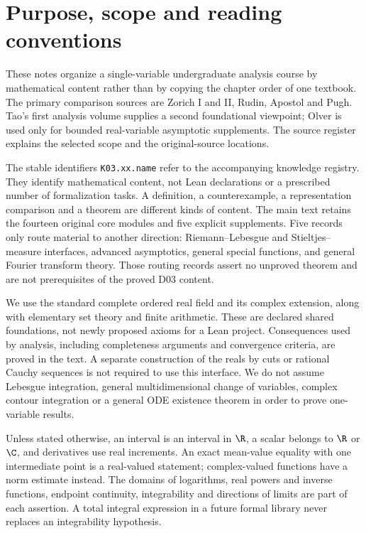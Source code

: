 \chapter*{Purpose, scope and reading conventions}
These notes organize a single-variable undergraduate analysis course by mathematical
content rather than by copying the chapter order of one textbook. The primary
comparison sources are Zorich I and II, Rudin, Apostol and Pugh. Tao's first
analysis volume supplies a second foundational viewpoint; Olver is used only
for bounded real-variable asymptotic supplements. The source register explains
the selected scope and the original-source locations.

The stable identifiers \texttt{K03.xx.name} refer to the accompanying knowledge
registry. They identify mathematical content, not Lean declarations or a prescribed
number of formalization tasks. A definition, a counterexample, a representation
comparison and a theorem are different kinds of content. The main text retains
the fourteen original core modules and five explicit supplements. Five records
only route material to another direction: Riemann--Lebesgue and Stieltjes--measure
interfaces, advanced asymptotics, general special functions, and general Fourier
transform theory. Those routing records assert no unproved theorem and are not
prerequisites of the proved D03 content.

We use the standard complete ordered real field and its complex extension, along
with elementary set theory and finite arithmetic. These are declared shared
foundations, not newly proposed axioms for a Lean project. Consequences used by
analysis, including completeness arguments and convergence criteria, are proved
in the text. A separate construction of the reals by cuts or rational Cauchy
sequences is not required to use this interface. We do not assume Lebesgue
integration, general multidimensional change of variables, complex contour
integration or a general ODE existence theorem in order to prove one-variable
results.

Unless stated otherwise, an interval is an interval in $\R$, a scalar belongs to
$\R$ or $\C$, and derivatives use real increments. An exact mean-value equality
with one intermediate point is a real-valued statement; complex-valued functions
have a norm estimate instead. The domains of logarithms, real powers and inverse
functions, endpoint continuity, integrability and directions of limits are part
of each assertion. A total integral expression in a future formal library never
replaces an integrability hypothesis.

